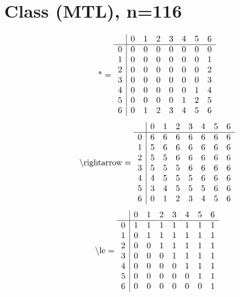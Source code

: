 \documentclass[11pt]{article}
\begin{document}
\section{Class (MTL), n=116}
\[\text{*} = 
\begin{array}{r | r r r r r r r}
 & 0 & 1 & 2 & 3 & 4 & 5 & 6 \\ \hline
0 & 0 & 0 & 0 & 0 & 0 & 0 & 0 \\
1 & 0 & 0 & 0 & 0 & 0 & 0 & 1 \\
2 & 0 & 0 & 0 & 0 & 0 & 0 & 2 \\
3 & 0 & 0 & 0 & 0 & 0 & 0 & 3 \\
4 & 0 & 0 & 0 & 0 & 0 & 1 & 4 \\
5 & 0 & 0 & 0 & 0 & 1 & 2 & 5 \\
6 & 0 & 1 & 2 & 3 & 4 & 5 & 6 \\
\end{array}
\]
\[\text{\textbackslash rightarrow} = 
\begin{array}{r | r r r r r r r}
 & 0 & 1 & 2 & 3 & 4 & 5 & 6 \\ \hline
0 & 6 & 6 & 6 & 6 & 6 & 6 & 6 \\
1 & 5 & 6 & 6 & 6 & 6 & 6 & 6 \\
2 & 5 & 5 & 6 & 6 & 6 & 6 & 6 \\
3 & 5 & 5 & 5 & 6 & 6 & 6 & 6 \\
4 & 4 & 5 & 5 & 5 & 6 & 6 & 6 \\
5 & 3 & 4 & 5 & 5 & 5 & 6 & 6 \\
6 & 0 & 1 & 2 & 3 & 4 & 5 & 6 \\
\end{array}
\]
\[\text{\textbackslash le} = 
\begin{array}{r | r r r r r r r}
 & 0 & 1 & 2 & 3 & 4 & 5 & 6 \\ \hline
0 & 1 & 1 & 1 & 1 & 1 & 1 & 1 \\
1 & 0 & 1 & 1 & 1 & 1 & 1 & 1 \\
2 & 0 & 0 & 1 & 1 & 1 & 1 & 1 \\
3 & 0 & 0 & 0 & 1 & 1 & 1 & 1 \\
4 & 0 & 0 & 0 & 0 & 1 & 1 & 1 \\
5 & 0 & 0 & 0 & 0 & 0 & 1 & 1 \\
6 & 0 & 0 & 0 & 0 & 0 & 0 & 1 \\
\end{array}
\]
\end{document}
